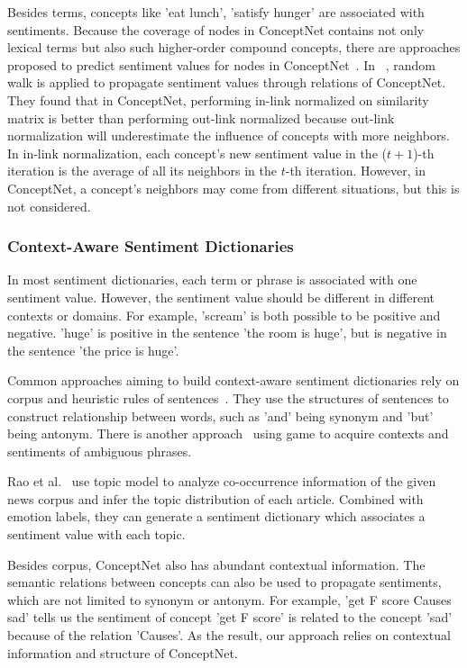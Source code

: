 Besides terms, concepts like 'eat lunch', 'satisfy hunger' are associated with sentiments. Because the coverage of nodes in ConceptNet contains not only lexical terms but also such higher-order compound concepts, there are approaches proposed to predict sentiment values for nodes in ConceptNet~\cite{Liu:IUI03, Cambria:AAAI10, Wu:TAAI11, Tsai:IEEE13, Wu:relSelect14}. In ~\cite{Tsai:IEEE13, Wu:relSelect14}, random walk is applied to propagate sentiment values through relations of ConceptNet. They found that in ConceptNet, performing in-link normalized on similarity matrix is better than performing out-link normalized because out-link normalization will underestimate the influence of concepts with more neighbors. In in-link normalization, each concept's new sentiment value in the ($t+1$)-th iteration is the average of all its neighbors in the $t$-th iteration. However, in ConceptNet, a concept's neighbors may come from different situations, but this is not considered.

\subsubsection{Context-Aware Sentiment Dictionaries}
In most sentiment dictionaries, each term or phrase is associated with one sentiment value. However, the sentiment value should be different in different contexts or domains. For example, 'scream' is both possible to be positive and negative. 'huge' is positive in the sentence 'the room is huge', but is negative in the sentence 'the price is huge'.

Common approaches aiming to build context-aware sentiment dictionaries rely on corpus and heuristic rules of sentences~\cite{Xu:PACLIC10, Xu:COLING10, Lu:WWW11}. They use the structures of sentences to construct relationship between words, such as 'and' being synonym and 'but' being antonym. There is another approach~\cite{Boia:AAAI14} using game to acquire contexts and sentiments of ambiguous phrases. 

Rao et al.~\cite{Rao:WWW14} use topic model to analyze co-occurrence information of the given news corpus and infer the topic distribution of each article. Combined with emotion labels, they can generate a sentiment dictionary which associates a sentiment value with each topic. 

Besides corpus, ConceptNet also has abundant contextual information. The semantic relations between concepts can also be used to propagate sentiments, which are not limited to synonym or antonym. For example, 'get F score Causes sad' tells us the sentiment of concept 'get F score' is related to the concept 'sad' because of the relation 'Causes'. As the result, our approach relies on contextual information and structure of ConceptNet.